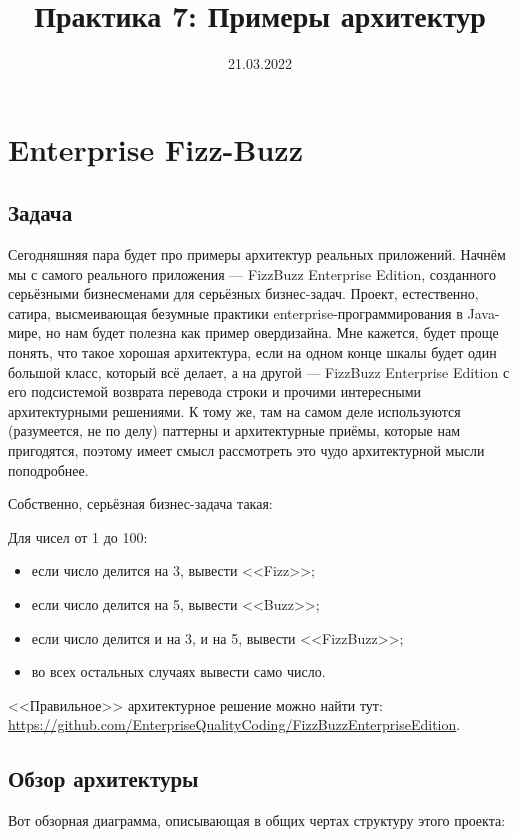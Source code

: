 \documentclass[a5paper]{article}
\title{Практика 7: Примеры архитектур}
\date{21.03.2022}
\begin{document}
\maketitle
\thispagestyle{empty}

\section{Enterprise Fizz-Buzz}

\subsection{Задача}

Сегодняшняя пара будет про примеры архитектур реальных приложений. Начнём мы с самого реального приложения --- FizzBuzz Enterprise Edition, созданного серьёзными бизнесменами для серьёзных бизнес-задач. Проект, естественно, сатира, высмеивающая безумные практики enterprise-программирования в Java-мире, но нам будет полезна как пример овердизайна. Мне кажется, будет проще понять, что такое хорошая архитектура, если на одном конце шкалы будет один большой класс, который всё делает, а на другой --- FizzBuzz Enterprise Edition с его подсистемой возврата перевода строки и прочими интересными архитектурными решениями. К тому же, там на самом деле используются (разумеется, не по делу) паттерны и архитектурные приёмы, которые нам пригодятся, поэтому имеет смысл рассмотреть это чудо архитектурной мысли поподробнее.

Собственно, серьёзная бизнес-задача такая:

Для чисел от 1 до 100:
\begin{itemize}
    \item если число делится на 3, вывести <<Fizz>>;
    \item если число делится на 5, вывести <<Buzz>>;
    \item если число делится и на 3, и на 5, вывести <<FizzBuzz>>;
    \item во всех остальных случаях вывести само число.
\end{itemize}

<<Правильное>> архитектурное решение можно найти тут: \url{https://github.com/EnterpriseQualityCoding/FizzBuzzEnterpriseEdition}.

\subsection{Обзор архитектуры}

Вот обзорная диаграмма, описывающая в общих чертах структуру этого проекта:
\end{document}
